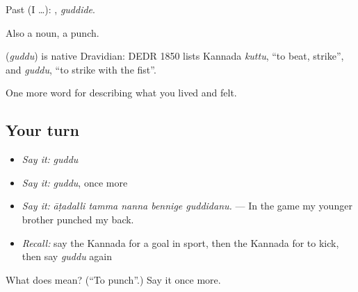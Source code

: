 Past (I …): , \emph{guddide}.

Also a noun, a punch.

\begin{cousinweb}
\textbf{} (\emph{guddu}) is native Dravidian: DEDR 1850 lists Kannada \emph{kuttu}, \textquotedblleft{}to beat, strike\textquotedblright{}, and \emph{guddu}, \textquotedblleft{}to strike with the fist\textquotedblright{}.
\end{cousinweb}

\begin{grammarlens}[title={What you've built}]
One more word for describing what you lived and felt.
\end{grammarlens}

\subsection*{Your turn}
\begin{itemize}
\raggedright
  \item \emph{Say it:} \emph{guddu}
  \item \emph{Say it:} \emph{guddu}, once more
  \item \emph{Say it:} \emph{āṭadalli tamma nanna bennige guddidanu.} — In the game my younger brother punched my back.
  \item \emph{Recall:} say the Kannada for a goal in sport, then the Kannada for to kick, then say \emph{guddu} again
\end{itemize}

\begin{tcolorbox}[breakable,colback=teal!4,colframe=teal!35!black,title={Before you move on}]
What does  mean? (\textquotedblleft{}To punch\textquotedblright{}.) Say it once more.
\end{tcolorbox}
